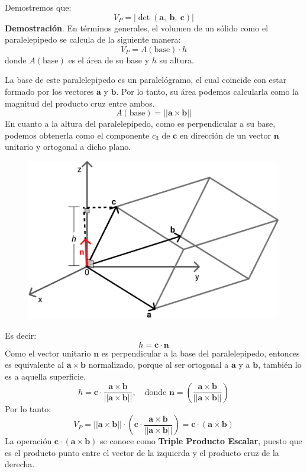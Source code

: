 \documentclass[12pt]{article}
\begin{document}
Demostremos que:
\[
  V_{P} = |\det(\mathbf{a}, \ \mathbf{b}, \ \mathbf{c})|
\]
\textbf{Demostración}. En términos generales, el volumen de un sólido como el paralelepipedo se calcula de la siguiente manera:
\[
V_{P} = A(\text{base}) \cdot h
\]
donde $A(\text{base})$ es el área de su base y $h$ su altura.

La base de este paralelepipedo es un paralelógramo, el cual coincide con estar formado por los vectores $\mathbf{a}$ y $\mathbf{b}$. Por lo tanto, su área podemos calcularla como la magnitud del producto cruz entre ambos.
\[
  A(\text{base}) = ||\mathbf{a} \times \mathbf{b}||
\]
En cuanto a la altura del paralelepipedo, como es perpendicular a su base, podemos obtenerla como el componente $c_{3}$ de $\mathbf{c}$ en dirección de un vector $\mathbf{n}$ unitario y ortogonal a dicho plano.

\begin{figure}[hbt!]
\centering
\includegraphics[scale=0.4]{img/triple-product-1.jpg}
\end{figure}

Es decir:
\[
  h = \mathbf{c} \cdot \mathbf{n}
\]
Como el vector unitario $\mathbf{n}$ es perpendicular a la base del paralelepipedo, entonces es equivalente al $\mathbf{a} \times \mathbf{b}$ normalizado, porque al ser ortogonal a $\mathbf{a}$ y a $\mathbf{b}$, también lo es a aquella superficie.
\[
  h = \mathbf{c} \cdot \frac{\mathbf{a} \times \mathbf{b}}{||\mathbf{a} \times \mathbf{b}||}, \quad \text{donde }
  \mathbf{n} = \left(\frac{\mathbf{a} \times \mathbf{b}}{||\mathbf{a} \times \mathbf{b}||}\right)
\]
Por lo tanto:
\[
  V_{P} = ||\mathbf{a} \times \mathbf{b}|| \cdot
          \left(\mathbf{c} \cdot \frac{\mathbf{a} \times \mathbf{b}}{||\mathbf{a} \times \mathbf{b}||}\right)
        = \mathbf{c} \cdot (\mathbf{a} \times \mathbf{b})
\]
La operación $\mathbf{c} \cdot (\mathbf{a} \times \mathbf{b})$ se conoce como \textbf{Triple Producto Escalar}, puesto que es el producto punto entre el vector de la izquierda y el producto cruz de la derecha.
\end{document}
